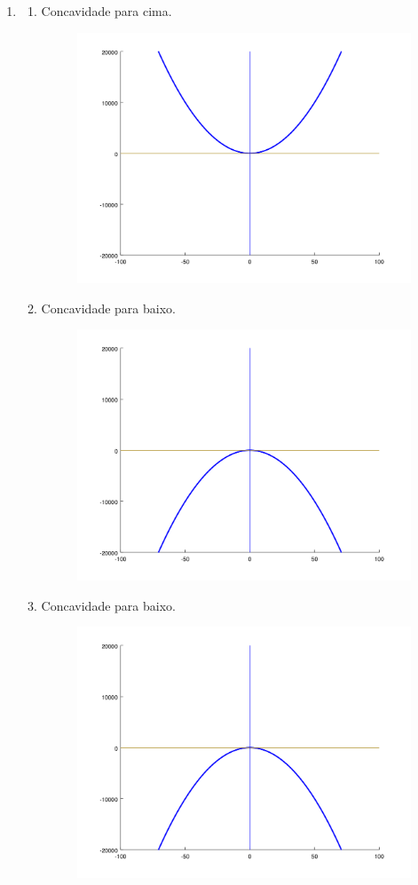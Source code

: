 \documentclass[11pt]{article}
\begin{document}
\begin{enumerate}
	\item 
	\begin{enumerate}
		\item Concavidade para cima.
		\begin{figure}[H]
			\centering
			\includegraphics[width=0.8\linewidth]{imgs2/chart9.png}
		\end{figure}
		\item Concavidade para baixo.
		\begin{figure}[H]
			\centering
			\includegraphics[width=0.8\linewidth]{imgs2/chart10.png}
		\end{figure}
		\item Concavidade para baixo. 
		\begin{figure}[H]
			\centering
			\includegraphics[width=0.8\linewidth]{imgs2/chart10.png}
		\end{figure}
	\end{enumerate}
\end{enumerate}
\end{document}
